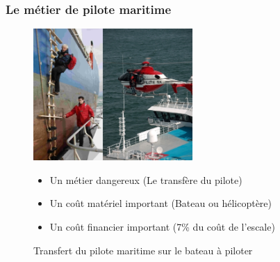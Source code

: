 \documentclass[8pt]{beamer}
\begin{document}
\begin{frame}
  \frametitle{Le métier de pilote maritime}

  \begin{figure}
    \begin{minipage}[c]{.52\linewidth}
        \centering
        \includegraphics[height=5cm]{pilotemaritime.jpg}
        \caption{Transfert du pilote maritime sur le bateau à piloter \footnotemark}
    \end{minipage}
    \hfill%
    \begin{minipage}[c]{.40\linewidth}
        \centering
        \begin{itemize}
        \item Un métier dangereux (Le transfère du pilote)\break
          \pause
        \item Un coût matériel important (Bateau ou hélicoptère)\break
          \pause
        \item Un coût financier important (7\% du coût de l'escale)
        \end{itemize}
    \end{minipage}
\end{figure}
  
\end{frame}
\end{document}
